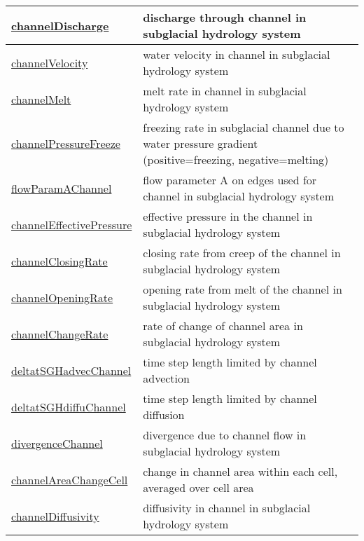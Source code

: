 {\begin{center}
\begin{longtable}{| p{2.0in} | p{4.0in} |}
    \hline
    \hyperref[subsec:var_sec_hydro_channelDischarge]{channelDischarge} & discharge through channel in subglacial hydrology system \\
    \hline
    \hyperref[subsec:var_sec_hydro_channelVelocity]{channelVelocity} & water velocity in channel in subglacial hydrology system \\
    \hline
    \hyperref[subsec:var_sec_hydro_channelMelt]{channelMelt} & melt rate in channel in subglacial hydrology system \\
    \hline
    \hyperref[subsec:var_sec_hydro_channelPressureFreeze]{channelPressureFreeze} & freezing rate in subglacial channel due to water pressure gradient (positive=freezing, negative=melting) \\
    \hline
    \hyperref[subsec:var_sec_hydro_flowParamAChannel]{flowParamAChannel} & flow parameter A on edges used for channel in subglacial hydrology system \\
    \hline
    \hyperref[subsec:var_sec_hydro_channelEffectivePressure]{channelEffectivePressure} & effective pressure in the channel in subglacial hydrology system \\
    \hline
    \hyperref[subsec:var_sec_hydro_channelClosingRate]{channelClosingRate} & closing rate from creep of the channel in subglacial hydrology system \\
    \hline
    \hyperref[subsec:var_sec_hydro_channelOpeningRate]{channelOpeningRate} & opening rate from melt of the channel in subglacial hydrology system \\
    \hline
    \hyperref[subsec:var_sec_hydro_channelChangeRate]{channelChangeRate} & rate of change of channel area in subglacial hydrology system \\
    \hline
    \hyperref[subsec:var_sec_hydro_deltatSGHadvecChannel]{deltatSGHadvecChannel} & time step length limited by channel advection \\
    \hline
    \hyperref[subsec:var_sec_hydro_deltatSGHdiffuChannel]{deltatSGHdiffuChannel} & time step length limited by channel diffusion \\
    \hline
    \hyperref[subsec:var_sec_hydro_divergenceChannel]{divergenceChannel} & divergence due to channel flow in subglacial hydrology system \\
    \hline
    \hyperref[subsec:var_sec_hydro_channelAreaChangeCell]{channelAreaChangeCell} & change in channel area within each cell, averaged over cell area \\
    \hline
    \hyperref[subsec:var_sec_hydro_channelDiffusivity]{channelDiffusivity} & diffusivity in channel in subglacial hydrology system \\
    \hline
\end{longtable}
\end{center}
}
